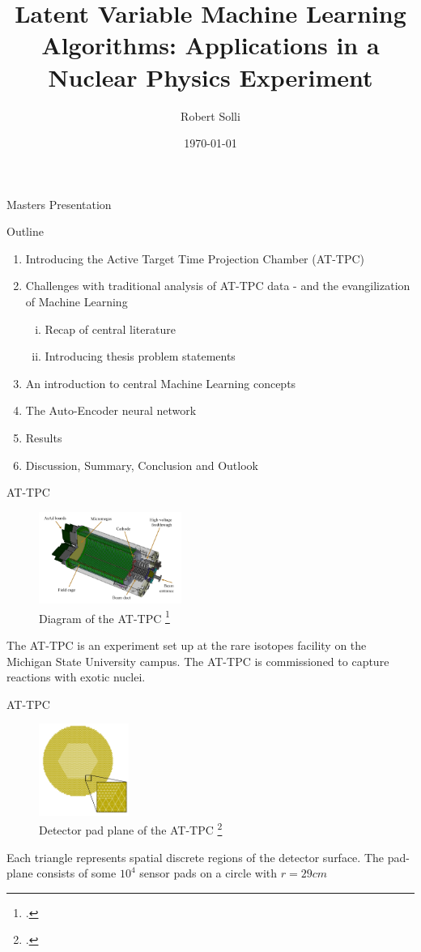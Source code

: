 \documentclass{beamer}
\title{Latent Variable Machine Learning Algorithms: Applications in a Nuclear Physics Experiment
}
\author{Robert Solli}
\institute{University of Oslo, Expert Analytics AS}
\date{\today}
\begin{document}
\begin{frame}[t]{Masters Presentation}
	\titlepage
\end{frame}

\begin{frame}[t]{Outline}
	\begin{enumerate}
		\item Introducing the Active Target Time Projection Chamber (AT-TPC)
		\item Challenges with traditional analysis of AT-TPC data - and the evangilization of Machine Learning
			\begin{enumerate}[(i)]
				\item Recap of central literature 
				\item Introducing thesis problem statements
			\end{enumerate}
		\item An introduction to central Machine Learning concepts
		\item The Auto-Encoder neural network
		\item Results 
		\item Discussion, Summary, Conclusion and Outlook
	\end{enumerate}
\end{frame}

\begin{frame}[t]{AT-TPC}
	\begin{figure}
		\centering
		\includegraphics[height=3cm]{../chapters/experimental_background/plots/at_tpc_schematic.png}
		\caption{Diagram of the AT-TPC \footcite{Bradt2017a}}\label{fig:attpc}
	\end{figure}
	The AT-TPC is an experiment set up at the rare isotopes facility on the Michigan State University campus. The AT-TPC is commissioned to capture reactions with exotic nuclei.
\end{frame}

\begin{frame}[t]{AT-TPC}
	\begin{figure}
		\centering
		\includegraphics[height=3cm]{../chapters/experimental_background/plots/at_tpc_padplane.png}
		\caption{Detector pad plane of the AT-TPC \footcite{Bradt2017a}}\label{fig:padplane}
	\end{figure}
	Each triangle represents spatial discrete regions of the detector surface. The pad-plane consists of some $10^4$ sensor pads on a circle with $r=29cm$
\end{frame}
\end{document}
